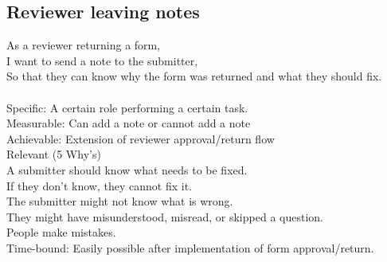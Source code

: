 \documentclass[10pt]{book}
\begin{document}
\begin{landscape}
\section*{Reviewer leaving notes}
As a reviewer returning a form,\\
I want to send a note to the submitter,\\
So that they can know why the form was returned and what they should fix.\\
\\
Specific: A certain role performing a certain task.\\
Measurable: Can add a note or cannot add a note\\
Achievable: Extension of reviewer approval/return flow\\
Relevant (5 Why's)\\
    \indent
    A submitter should know what needs to be fixed.\\
    \indent
    If they don't know, they cannot fix it.\\
    \indent
    The submitter might not know what is wrong.\\
    \indent
    They might have misunderstood, misread, or skipped a question.\\
    \indent
    People make mistakes.\\
Time-bound: Easily possible after implementation of form approval/return.
\end{landscape}
\end{document}
